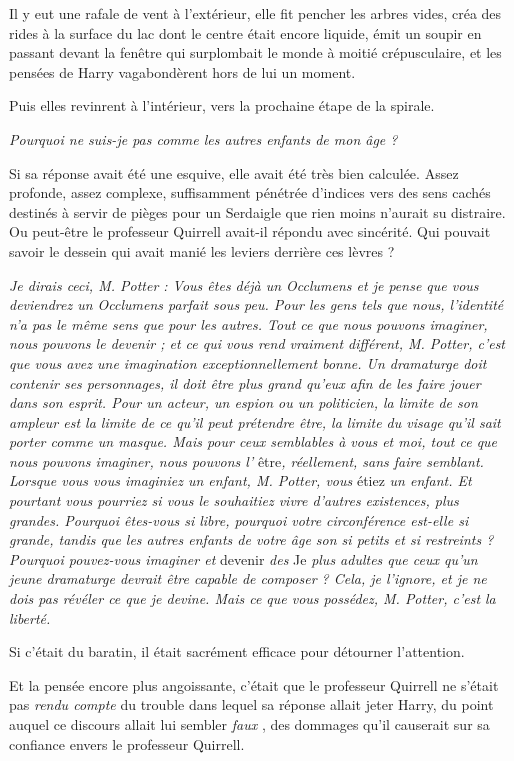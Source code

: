 Il y eut une rafale de vent à l'extérieur, elle fit pencher les arbres vides, créa des rides à la surface du lac dont le centre était encore liquide, émit un soupir en passant devant la fenêtre qui surplombait le monde à moitié crépusculaire, et les pensées de Harry vagabondèrent hors de lui un moment.

Puis elles revinrent à l'intérieur, vers la prochaine étape de la spirale.

\emph{Pourquoi ne suis-je pas comme les autres enfants de mon âge ?} 

Si sa réponse avait été une esquive, elle avait été très bien calculée. Assez profonde, assez complexe, suffisamment pénétrée d'indices vers des sens cachés destinés à servir de pièges pour un Serdaigle que rien moins n'aurait su distraire. Ou peut-être le professeur Quirrell avait-il répondu avec sincérité. Qui pouvait savoir le dessein qui avait manié les leviers derrière ces lèvres ?

\emph{Je dirais ceci, M. Potter : Vous êtes déjà un Occlumens et je pense que vous deviendrez un Occlumens parfait sous peu. Pour les gens tels que nous, l'identité n'a pas le même sens que pour les autres. Tout ce que nous pouvons imaginer, nous pouvons le devenir ; et ce qui vous rend vraiment différent, M. Potter, c'est que vous avez une imagination exceptionnellement bonne. Un dramaturge doit contenir ses personnages, il doit être plus grand qu'eux afin de les faire jouer dans son esprit. Pour un acteur, un espion ou un politicien, la limite de son ampleur est la limite de ce qu'il peut prétendre être, la limite du visage qu'il sait porter comme un masque. Mais pour ceux semblables à vous et moi, tout ce que nous pouvons imaginer, nous pouvons l'} être\emph{, réellement, sans faire semblant. Lorsque vous vous imaginiez un enfant, M. Potter, vous } étiez\emph{ un enfant. Et pourtant vous pourriez si vous le souhaitiez vivre d'autres existences, plus grandes. Pourquoi êtes-vous si libre, pourquoi votre circonférence est-elle si grande, tandis que les autres enfants de votre âge son si petits et si restreints ? Pourquoi pouvez-vous imaginer et } devenir\emph{ des } Je\emph{ plus adultes que ceux qu'un jeune dramaturge devrait être capable de composer ? Cela, je l'ignore, et je ne dois pas révéler ce que je devine. Mais ce que vous possédez, M. Potter, c'est la liberté.} 

Si c'était du baratin, il était sacrément efficace pour détourner l'attention.

Et la pensée encore plus angoissante, c'était que le professeur Quirrell ne s'était pas \emph{rendu compte}  du trouble dans lequel sa réponse allait jeter Harry, du point auquel ce discours allait lui sembler \emph{faux} , des dommages qu'il causerait sur sa confiance envers le professeur Quirrell.

